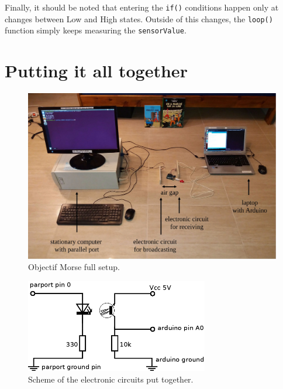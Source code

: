 \documentclass[12pt]{report}
\begin{document}
Finally, it should be noted that entering the \verb|if()| conditions happen only at changes between Low and High states. Outside of this changes, the \verb|loop()| function simply keeps measuring the \verb|sensorValue|.




\chapter{Putting it all together}


\begin{figure}[H]
\centering\includegraphics[width=15cm]{full_setup}
\caption{Objectif Morse full setup.}				
\label{fig:full_setup}
\end{figure}

\begin{figure}[H]
\centering\includegraphics[width=8cm]{scheme}
\caption{Scheme of the electronic circuits put together.}				
\label{fig:circuits}
\end{figure}
\end{document}
